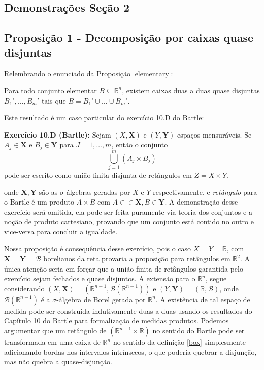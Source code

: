 \documentclass[12pt,letterpaper]{article}
\newcommand{\real}{\mathbb{R}}
\newcommand{\rr}{\mathbb{R}^2}
\newcommand{\rn}{\mathbb{R}^n}
\newcommand{\bd}[1]{\boldsymbol{#1}}
\begin{document}
	\begin{appendices}
		\section{Demonstrações Seção 2}
		\label{appA}
			\subsection{Proposição 1 - Decomposição por caixas quase disjuntas}
			Relembrando o enunciado da Proposição \ref{elementary}:
			
			Para todo conjunto elementar $B\subseteq\rn$, existem caixas duas a duas quase disjuntas $B_1',\ldots,B_m'$ tais que $B=B_1'\cup\ldots\cup B_m'$.
			
			Este resultado é um caso particular do exercício 10.D do Bartle\cite{bartle2014elements}:
			
			\textbf{Exercício 10.D (Bartle):} Sejam $(X,\bd X)$ e $(Y,\bd Y)$ espaços mensuráveis. Se $A_j\in\bd X$ e $B_j\in\bd Y$ para $J=1,\ldots,m$, então o conjunto 
			$$\bigcup_{j=1}^{m}(A_j\times B_j)$$
			pode ser escrito como união finita disjunta de retângulos em $Z=X\times Y$.
			
			onde $\bd X,\bd Y$ são as $\sigma$-álgebras geradas por $X$ e $Y$ respectivamente, e \textit{retângulo} para o Bartle é um produto $A\times B$ com $A\in\in\bd X,B\in\bd Y$. A demonstração desse exercício será omitida, ela pode ser feita puramente via teoria dos conjuntos e a noção de produto cartesiano, provando que um conjunto está contido no outro e vice-versa  para concluir a igualdade.
			
			Nossa proposição é consequência desse exercício, pois o caso $X=Y=\real$, com $\bd X=\bd Y=\mathcal{B}$ borelianos da reta provaria a proposição para retângulos em $\rr$. A única atenção seria em forçar que a união finita de retângulos garantida pelo exercício sejam fechados e quase disjuntos. A extensão para o $\rn$, segue considerando $(X,\bd X)=(\real^{n-1},\mathcal{B}(\real^{n-1}))$ e $(Y,\bd Y)=(\real,\mathcal{B})$, onde $\mathcal{B}(\real^{n-1})$ é a $\sigma$-álgebra de Borel gerada por $\rn$. A existência de tal espaço de medida pode ser construída indutivamente duas a duas usando os resultados do Capítulo 10 do Bartle\cite{bartle2014elements} para formalização de medidas produtos. Podemos argumentar que um retângulo de $(\real^{n-1}\times\real)$ no sentido do Bartle pode ser transformada em uma caixa de $\rn$ no sentido da definição \ref{box} simplesmente adicionando bordas nos intervalos intrínsecos, o que poderia quebrar a disjunção, mas não quebra a quase-disjunção.
			

\end{appendices}
\end{document}
